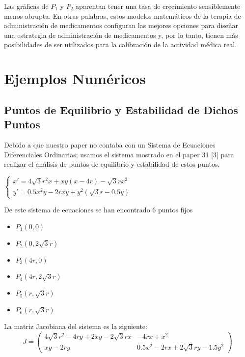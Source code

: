 \documentclass[a4 paper, 12pt]{article}
\begin{document}
Las gr\'aficas de $P_1$ y $P_2$  aparentan tener una tasa de crecimiento sensiblemente menos abrupta. En otras palabras, estos modelos matem\'aticos de la terapia de administraci\'on de medicamentos configuran las mejores opciones para diseñar una estrategia de administraci\'on de medicamentos y, por lo tanto, tienen m\'as posibilidades de ser utilizados para la calibraci\'on de la actividad m\'edica real.

\section{Ejemplos Num\'ericos}
\subsection{Puntos de Equilibrio y Estabilidad de Dichos Puntos}
Debido a que nuestro paper no contaba con un Sistema de Ecuaciones Diferenciales Ordinarias; usamos el sistema mostrado en el paper 31 [3] para realizar el an\'alisis de puntos de equilibrio y estabilidad de estos puntos.

\begin{center}
  $\displaystyle  \left\{
    \begin{array}{ll}
      x' = 4 \sqrt{3}r^{2}x + xy(x-4r) - \sqrt{3}rx^{2}\\
     y' = 0.5x^{2}y - 2rxy + y^{2}(\sqrt{3}r - 0.5y)
    \end{array}
\right.$
\end{center}

De este sistema de ecuaciones se han encontrado 6 puntos fijos
\begin{itemize}
\item $ P_{1} (0,0)$
\item $ P_{2} (0,2\sqrt{3}r)$
\item $ P_{3} (4r,0) $
\item $ P_{4} (4r,2\sqrt{3}r)$
\item $ P_{5} (r,\sqrt{3}r)$
\item $ P_{6} (r,\sqrt{3}r)$
\end{itemize}

La matriz Jacobiana del sistema es la siguiente:
\begin{displaymath}
  J =    \left(
      \begin{array}{cc}
        4 \sqrt{3}r^{2}-4ry +2xy - 2\sqrt{3}rx  & -4rx + x^2  \\
       xy - 2ry & 0.5x^2 -2rx + 2\sqrt{3}ry - 1.5y^2
      \end{array}
    \right)
\end{displaymath}
\end{document}
